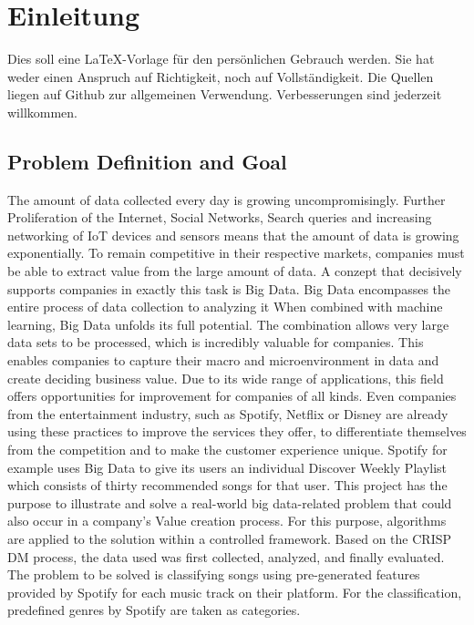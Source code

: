 \section{Einleitung}
Dies soll eine \LaTeX{}-Vorlage für den persönlichen Gebrauch werden. Sie hat weder einen Anspruch auf Richtigkeit, noch auf Vollständigkeit. Die Quellen liegen auf Github zur allgemeinen Verwendung. Verbesserungen sind jederzeit willkommen.

\subsection{Problem Definition and Goal}
The amount of data collected every day is growing uncompromisingly. Further Proliferation of the Internet, Social Networks, 
Search queries and increasing networking of IoT devices and sensors means that the amount of data is growing exponentially. 
To remain competitive in their respective markets, companies must be able to extract value from the large amount of data.
 A conzept that decisively supports companies in exactly this task is Big Data. Big Data encompasses the entire process of data collection to analyzing it
 When combined with machine learning, Big Data unfolds its full potential. The combination allows very large data sets to be processed, 
 which is incredibly valuable for companies. This enables companies to capture their macro and microenvironment in data and create deciding business value. 
 Due to its wide range of applications, this field offers opportunities for improvement for companies of all kinds. 
 Even companies from the entertainment industry, such as Spotify, Netflix or Disney are already using these practices to improve the services they offer, 
 to differentiate themselves from the competition and to make the customer experience unique. 
 Spotify for example uses Big Data to give its users an individual Discover Weekly Playlist which consists of thirty recommended songs for that user. 
 This project has the purpose to illustrate and solve a real-world big data-related problem that could also occur in a company's Value creation process. 
 For this purpose, algorithms are applied to the solution within a controlled framework. Based on the \ac{CRISP DM} process, the data used was first collected, analyzed, 
 and finally evaluated. The problem to be solved is classifying songs using pre-generated features provided by Spotify for each music track on their platform. 
 For the classification, predefined genres by Spotify are taken as categories.

